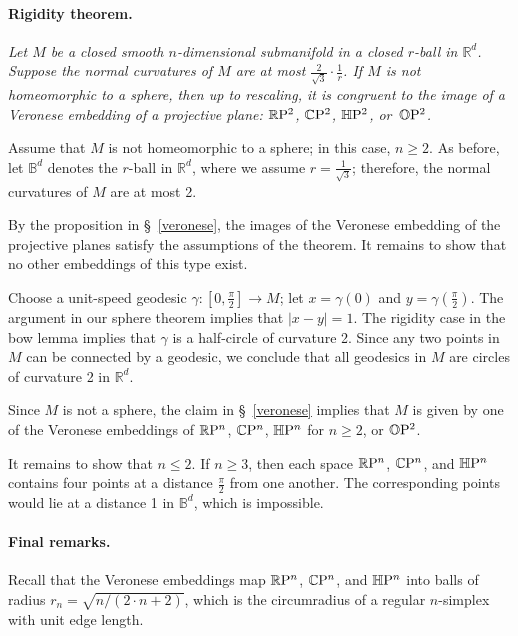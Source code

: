 \documentclass[a4paper,10pt]{article}
\begin{document}
\paragraph{Rigidity theorem.}\label{thm:=}
\textit{Let \( M \) be a closed smooth \( n \)-dimensional submanifold in a closed \( r \)-ball in \( \mathbb{R}^d \).
Suppose the normal curvatures of \( M \) are at most \( \tfrac{2}{\sqrt{3}} \cdot \tfrac{1}{r} \).
If \( M \) is not homeomorphic to a sphere, then up to rescaling, it is congruent to the image of a Veronese embedding of a projective plane: \( \mathbb{R}\mathrm{P}^2 \), \( \mathbb{C}\mathrm{P}^2 \), \( \mathbb{H}\mathrm{P}^2 \), or~\( \mathbb{O}\mathrm{P}^2 \).}

\medskip

Assume that \( M \) is not homeomorphic to a sphere;
in this case, \( n \geqslant 2 \).
As before, let \( \mathbb{B}^d \) denotes the \( r \)-ball in \( \mathbb{R}^d \), where we assume \( r = \tfrac{1}{\sqrt{3}} \);
therefore, the normal curvatures of \( M \) are at most 2.

By the proposition in §~\ref{veronese}, the images of the Veronese embedding of the projective planes satisfy the assumptions of the theorem.
It remains to show that no other embeddings of this type exist.

Choose a unit-speed geodesic \( \gamma \colon [0, \tfrac{\pi}{2}] \to M \);
let \( x = \gamma(0) \) and \( y = \gamma(\tfrac{\pi}{2}) \).
The argument in our sphere theorem implies that \( |x-y| = 1 \).
The rigidity case in the bow lemma implies that \( \gamma \) is a half-circle of curvature 2.
Since any two points in \( M \) can be connected by a geodesic, we conclude that all geodesics in \( M \) are circles of curvature 2 in \( \mathbb{R}^d \).


Since \( M \) is not a sphere, the claim in §~\ref{veronese} implies that \( M \) is given by one of the Veronese embeddings of \( \mathbb{R}\mathrm{P}^n \), \( \mathbb{C}\mathrm{P}^n \), \( \mathbb{H}\mathrm{P}^n \) for \( n \geqslant 2 \), or \( \mathbb{O}\mathrm{P}^2 \).

It remains to show that \( n \leqslant 2 \).
If $n\geqslant 3$, then each space \( \mathbb{R}\mathrm{P}^n \), \( \mathbb{C}\mathrm{P}^n \), and \( \mathbb{H}\mathrm{P}^n \) contains four points at a distance \( \tfrac{\pi}{2} \) from one another.
The corresponding points would lie at a distance 1 in \( \mathbb{B}^d \), which is impossible.
\qeds


\paragraph{Final remarks.}
Recall that the Veronese embeddings map \( \mathbb{R}\mathrm{P}^n \), \( \mathbb{C}\mathrm{P}^n \), and \( \mathbb{H}\mathrm{P}^n \) into balls of radius \( r_n = \sqrt{n/(2\cdot n + 2)} \), which is the circumradius of a regular \( n \)-simplex with unit edge length.
\end{document}
